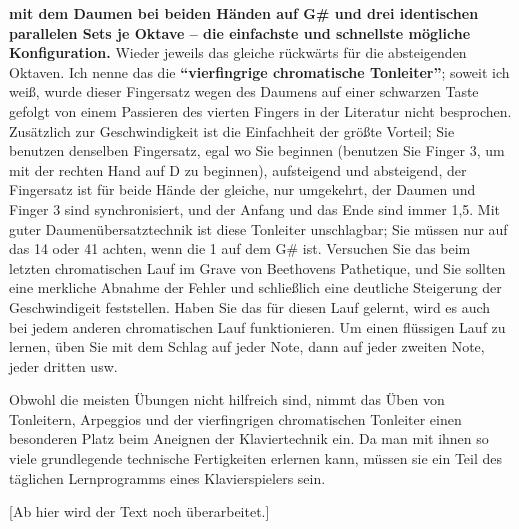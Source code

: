 \textbf{mit dem Daumen bei beiden Händen auf G\# und drei identischen parallelen Sets je Oktave -- die einfachste und schnellste mögliche Konfiguration.}
Wieder jeweils das gleiche rückwärts für die absteigenden Oktaven.
Ich nenne das die \textbf{\enquote{vierfingrige chromatische Tonleiter}}; soweit ich weiß, wurde dieser Fingersatz wegen des Daumens auf einer schwarzen Taste gefolgt von einem Passieren des vierten Fingers in der Literatur nicht besprochen.
Zusätzlich zur Geschwindigkeit ist die Einfachheit der größte Vorteil; Sie benutzen denselben Fingersatz, egal wo Sie beginnen (benutzen Sie Finger 3, um mit der rechten Hand auf D zu beginnen), aufsteigend und absteigend, der Fingersatz ist für beide Hände der gleiche, nur umgekehrt, der Daumen und Finger 3 sind synchronisiert, und der Anfang und das Ende sind immer 1,5.  
Mit guter Daumenübersatztechnik ist diese Tonleiter unschlagbar; Sie müssen nur auf das 14 oder 41 achten, wenn die 1 auf dem G\# ist.
Versuchen Sie das beim letzten chromatischen Lauf im Grave von Beethovens Pathetique, und Sie sollten eine merkliche Abnahme der Fehler und schließlich eine deutliche Steigerung der Geschwindigeit feststellen.
Haben Sie das für diesen Lauf gelernt, wird es auch bei jedem anderen chromatischen Lauf funktionieren.
Um einen flüssigen Lauf zu lernen, üben Sie mit dem Schlag auf jeder Note, dann auf jeder zweiten Note, jeder dritten usw.

Obwohl die meisten Übungen nicht hilfreich sind, nimmt das Üben von Tonleitern, Arpeggios und der vierfingrigen chromatischen Tonleiter einen besonderen Platz beim Aneignen der Klaviertechnik ein.
Da man mit ihnen so viele grundlegende technische Fertigkeiten erlernen kann, müssen sie ein Teil des täglichen Lernprogramms eines Klavierspielers sein.


[Ab hier wird der Text noch überarbeitet.]




